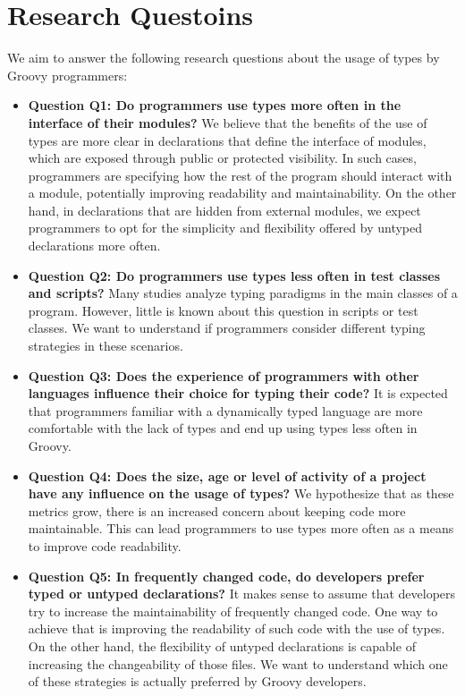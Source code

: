 \documentclass[msc]{ppgccufmg}
\begin{document}
\section{Research Questoins\label{questions}}
We aim to answer the following research questions about the usage of types by Groovy programmers:

\begin{itemize}
	\item \textbf{Question Q1: Do programmers use types more often in the interface of their modules?} We believe that the benefits of the use of types are more clear in declarations that define the interface of modules, which are exposed through public or protected visibility. In such cases, programmers are specifying how the rest of the program should interact with a module, potentially improving readability and maintainability. On the other hand, in declarations that are hidden from external modules, we expect programmers to opt for the simplicity and flexibility offered by untyped declarations more often. 
	
	\item \textbf{Question Q2: Do programmers use types less often in test classes and scripts?} Many studies analyze typing paradigms in the main classes of a program. However, little is known about this question in scripts or test classes. We want to understand if programmers consider different typing strategies in these scenarios.

	\item \textbf{Question Q3: Does the experience of programmers with other languages influence their choice for typing their code?} It is expected that programmers familiar with a dynamically typed language are more comfortable with the lack of types and end up using types less often in Groovy. 

	\item \textbf{Question Q4: Does the size, age or level of activity of a project have any influence on the usage of types?} We hypothesize that as these metrics grow, there is an increased concern about keeping code more maintainable. This can lead programmers to use types more often as a means to improve code readability.

	\item \textbf{Question Q5: In frequently changed code, do developers prefer typed or untyped declarations?} It makes sense to assume that developers try to increase the maintainability of frequently changed code. One way to achieve that is improving the readability of such code with the use of types. On the other hand, the flexibility of untyped declarations is capable of increasing the changeability of those files. We want to understand which one of these strategies is actually preferred by Groovy developers.

\end{itemize}
\end{document}
